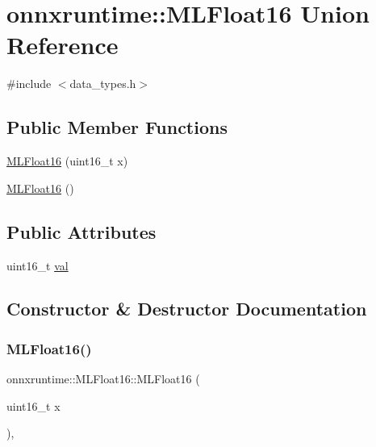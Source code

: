 \hypertarget{uniononnxruntime_1_1MLFloat16}{}\section{onnxruntime\+:\+:M\+L\+Float16 Union Reference}
\label{uniononnxruntime_1_1MLFloat16}


{\ttfamily \#include $<$data\+\_\+types.\+h$>$}

\subsection*{Public Member Functions}
\begin{DoxyCompactItemize}
\item 
\mbox{\hyperlink{uniononnxruntime_1_1MLFloat16_afe0879aac27f8d07fad02614a1701b5f}{M\+L\+Float16}} (uint16\+\_\+t x)
\item 
\mbox{\hyperlink{uniononnxruntime_1_1MLFloat16_a11f4ab404dd01c8f05b135635b0e9fc7}{M\+L\+Float16}} ()
\end{DoxyCompactItemize}
\subsection*{Public Attributes}
\begin{DoxyCompactItemize}
\item 
uint16\+\_\+t \mbox{\hyperlink{uniononnxruntime_1_1MLFloat16_a26dd15c6336cbdeb71cbd86a6cd096d8}{val}}
\end{DoxyCompactItemize}


\subsection{Constructor \& Destructor Documentation}
\mbox{\label{uniononnxruntime_1_1MLFloat16_afe0879aac27f8d07fad02614a1701b5f}} 
\subsubsection{\texorpdfstring{M\+L\+Float16()}{MLFloat16()}\hspace{0.1cm}{\footnotesize\ttfamily [1/2]}}
{\footnotesize\ttfamily onnxruntime\+::\+M\+L\+Float16\+::\+M\+L\+Float16 (\begin{DoxyParamCaption}\item[{uint16\+\_\+t}]{x }\end{DoxyParamCaption})\hspace{0.3cm}{\ttfamily [inline]}, {\ttfamily [explicit]}}


